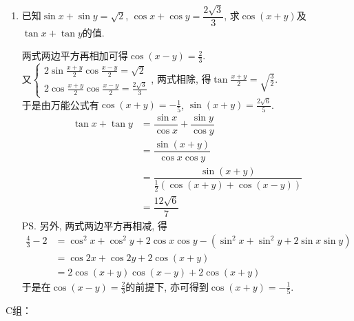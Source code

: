 \begin{enumerate}
\item 已知$\sin{x}+\sin{y}=\sqrt{2}$, $\cos{x}+\cos{y}=\dfrac{2\sqrt{3}}{3}$, 求$\cos(x+y)$及$\tan{x}+\tan{y}$的值. 
\begin{jieda}
两式两边平方再相加可得$\cos(x-y)=\frac{2}{3}$. \\
又$\begin{cases}
2\sin\frac{x+y}{2}\cos\frac{x-y}{2}=\sqrt{2}\\
2\cos\frac{x+y}{2}\cos\frac{x-y}{2}=\frac{2\sqrt{3}}{3}
\end{cases}$, 两式相除, 得$\tan\frac{x+y}{2}=\sqrt{\frac{3}{2}}$. \\
于是由万能公式有$\cos(x+y)=-\frac{1}{5}$, $\sin(x+y)=\frac{2\sqrt{6}}{5}$. 
\begin{align*}
\tan{x}+\tan{y} & = \dfrac{\sin{x}}{\cos{x}}+\dfrac{\sin{y}}{\cos{y}}\\
& = \dfrac{\sin(x+y)}{\cos{x}\cos{y}}\\
& = \dfrac{\sin(x+y)}{\frac{1}{2}(\cos(x+y)+\cos(x-y))}\\
& = \dfrac{12\sqrt{6}}{7}
\end{align*}
\ps 另外, 两式两边平方再相减, 得
\begin{align*}
\frac{4}{3}-2
& = \cos^2x+\cos^2y+2\cos{x}\cos{y}-(\sin^2x+\sin^2y+2\sin{x}\sin{y})\\
& = \cos2x+\cos2y+2\cos(x+y)\\
& = 2\cos(x+y)\cos(x-y)+2\cos(x+y)
\end{align*}
于是在$\cos(x-y)=\frac{2}{3}$的前提下, 亦可得到$\cos(x+y)=-\frac{1}{5}$. 
\end{jieda}

\end{enumerate}


C组：


